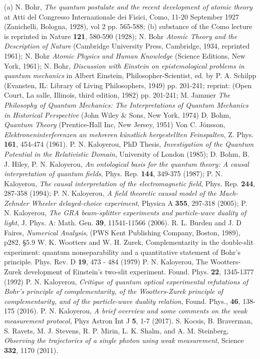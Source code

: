 \begin{thebibliography}{99}
 (a) N. Bohr, {\it The quantum postulate and the recent development of atomic theory} at Atti del Congresso Internazionale dei Fisici, Como, 11-20 September 1927 (Zanichelli, Bologna, 1928), vol 2   pp. 565-588; (b) substance of the Como lecture is reprinted in Nature {\bf 121}, 580-590 (1928); N. Bohr \textit{Atomic Theory and the Description of Nature} (Cambridge University Press, Cambridge, 1934, reprinted 1961); N. Bohr  \textit{ Atomic Physics and Human Knowledge} (Science Editions, New York, 1961); N. Bohr,  {\it Discussion with Einstein on epistemological problems in quantum mechanics} in  Albert Einstein, Philosopher-Scientist, ed. by P. A. Schilpp (Evansten, IL: Library of Living Philosophers, 1949) pp. 201-241;  reprint: (Open Court, La salle,  Illinois, third edition, 1982) pp. 201-241;  M. Jammer \textit{ The Philosophy of Quantum Mechanics: The Interpretations of Quantum Mechanics in Historical Perspective} (John Wiley \& Sons, New York, 1974) 
 D. Bohm,  {\it Quantum Theory} (Prentice-Hall Inc, New Jersey, 1951)
 Von C. J\"{o}nsson, {\it Elektroneninterferenzen an mehreren k\"{u}nstlich hergestellten Feinspalten}, Z. Phys. {\bf 161}, 454-474 (1961).
 P. N. Kaloyerou, PhD Thesis, {\it Investigation of the Quantum Potential in the Relativistic Domain}, University of London (1985); D. Bohm, B. J. Hiley, P. N. Kaloyerou, {\it An ontological basis for the quantum theory: A causal interpretation of  quantum fields}, Phys. Rep. {\bf 144}, 349-375 (1987);  P. N. Kaloyerou, {\it The causal interpretation of the electromagnetic field}, Phys. Rep.  {\bf 244}, 287-358 (1994); P. N. Kaloyerou, {\it A field theoretic causal model  of the Mach-Zehnder Wheeler delayed-choice experiment}, Physica A {\bf 355},  297-318 (2005); P. N. Kaloyerou, {\it The GRA beam-splitter experiments and particle-wave duality of light}, J. Phys. A: Math. Gen.  {\bf 39}, 11541-11566 (2006).
 R. L. Burden and J. D Faires, {\it Numerical Analysis}, (PWS Kent Publishing Company, Boston, 1989), p282, \S 5.9
 W. K. Wootters and W. H. Zurek, Complementarity in the double-slit experiment: quantum nonseparability and a quantitative statement of Bohr's principle. Phys. Rev. D {\bf 19}, 473 - 484 (1979)
 P. N. Kaloyerou,  The Wootters-Zurek development of Einstein's two-slit  experiment. Found. Phys.  {\bf 22}, 1345-1377 (1992)
 P. N. Kaloyerou, {\it Critique of quantum optical experimental refutations of Bohr's principle of complementarity, of the Wootters-Zurek principle of complementarity, and of the particle-wave duality relation}, Found. Phys., {\bf 46}, 138-175 (2016).
 P. N. Kaloyerou, {\it A brief overview and some comments on the weak measurement protocol}, Phys Astron Int J {\bf 5}, 1-7 (2017).
 S. Kocsis, B. Braverman, S. Ravets, M. J. Stevens, R. P. Mirin, L. K. Shalm, and A. M. Steinberg, {\it Observing the trajectories of a single photon using
weak measurement}, Science {\bf 332}, 1170 (2011).
\end{thebibliography}
